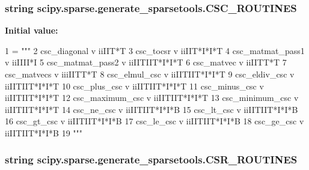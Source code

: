 \subsubsection[{C\+S\+C\+\_\+\+R\+O\+U\+T\+I\+N\+E\+S}]{\setlength{\rightskip}{0pt plus 5cm}string scipy.\+sparse.\+generate\+\_\+sparsetools.\+C\+S\+C\+\_\+\+R\+O\+U\+T\+I\+N\+E\+S}\label{namespacescipy_1_1sparse_1_1generate__sparsetools_a2bee8bb0ce54b9f73ccc8682d6377e6c}
{\bfseries Initial value\+:}
\begin{DoxyCode}
1 = \textcolor{stringliteral}{"""}
2 \textcolor{stringliteral}{csc\_diagonal        v iiIIT*T}
3 \textcolor{stringliteral}{csc\_tocsr           v iiIIT*I*I*T}
4 \textcolor{stringliteral}{csc\_matmat\_pass1    v iiIIII*I}
5 \textcolor{stringliteral}{csc\_matmat\_pass2    v iiIITIIT*I*I*T}
6 \textcolor{stringliteral}{csc\_matvec          v iiIITT*T}
7 \textcolor{stringliteral}{csc\_matvecs         v iiiIITT*T}
8 \textcolor{stringliteral}{csc\_elmul\_csc       v iiIITIIT*I*I*T}
9 \textcolor{stringliteral}{csc\_eldiv\_csc       v iiIITIIT*I*I*T}
10 \textcolor{stringliteral}{csc\_plus\_csc        v iiIITIIT*I*I*T}
11 \textcolor{stringliteral}{csc\_minus\_csc       v iiIITIIT*I*I*T}
12 \textcolor{stringliteral}{csc\_maximum\_csc     v iiIITIIT*I*I*T}
13 \textcolor{stringliteral}{csc\_minimum\_csc     v iiIITIIT*I*I*T}
14 \textcolor{stringliteral}{csc\_ne\_csc          v iiIITIIT*I*I*B}
15 \textcolor{stringliteral}{csc\_lt\_csc          v iiIITIIT*I*I*B}
16 \textcolor{stringliteral}{csc\_gt\_csc          v iiIITIIT*I*I*B}
17 \textcolor{stringliteral}{csc\_le\_csc          v iiIITIIT*I*I*B}
18 \textcolor{stringliteral}{csc\_ge\_csc          v iiIITIIT*I*I*B}
19 \textcolor{stringliteral}{"""}
\end{DoxyCode}
\hypertarget{namespacescipy_1_1sparse_1_1generate__sparsetools_a92b8d452abc51ffe88f8cea3ee3744b4}{}
\subsubsection[{C\+S\+R\+\_\+\+R\+O\+U\+T\+I\+N\+E\+S}]{\setlength{\rightskip}{0pt plus 5cm}string scipy.\+sparse.\+generate\+\_\+sparsetools.\+C\+S\+R\+\_\+\+R\+O\+U\+T\+I\+N\+E\+S}\label{namespacescipy_1_1sparse_1_1generate__sparsetools_a92b8d452abc51ffe88f8cea3ee3744b4}
\hypertarget{namespacescipy_1_1sparse_1_1generate__sparsetools_a683454f01c744c00ae18bb6954b6a722}{}
